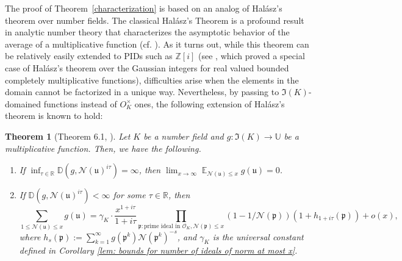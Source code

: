 \documentclass[11pt]{amsart}
\newtheorem{theorem}[lemma]{Theorem}
\theoremstyle{definition}
\DeclareMathOperator*{\E}{\mathbb{E}}
\newcommand{\D}{{\mathbb D}}
\newcommand{\NN}{{\mathcal N}}
\newcommand{\R}{{\mathbb R}}
\newcommand{\Z}{{\mathbb Z}}
\newcommand{\U}{{\mathbb U}}
\newcommand{\mf}{\mathfrak}
\begin{document}
The proof of Theorem~\ref{characterization} is based on an analog of Hal\'asz's theorem over number fields. The classical Hal\'asz's Theorem is a profound result in analytic number theory that characterizes the asymptotic behavior of the average of a multiplicative function (cf. \cite[Satz~1 and Satz~1$'$]{halasz68}). As it turns out, while this theorem can be relatively easily extended to PIDs such as $\Z[i]$ (see \cite[Thoerems A and 1.2]{dlms24}, which proved a special case of Hal\'asz's theorem over the Gaussian integers for real valued bounded completely multiplicative functions), difficulties arise when the elements in the domain cannot be factorized in a unique way. 
 Nevertheless, by passing to $\mf I(K)$-domained functions instead of $O_K^{\times}$ ones, the following extension of Hal\'asz's theorem is known to hold:


\begin{theorem}[Theorem 6.1, \cite{lucht2001}]\label{C22intro}
     Let $K$ be a number field and $g\colon\mf{I}(K)\to\U$ be a multiplicative function. Then, we have the following.
     \begin{enumerate}
         \item If $\inf_{\tau\in\R}\D(g,\NN(\mf u)^{i\tau})=\infty$, then $\lim_{x \to \infty} \E_{\NN(\mf u)\leq x}g(\mf u)=0$.
         \item If $\D(g,\NN(\mf u)^{i\tau})<\infty$ for some $\tau\in\R$, then
         $$\sum_{1 \leq \NN(\mf u)\leq x}g(\mf u) = \gamma_{K}\cdot\frac{x^{1+i\tau}}{1+i\tau}\prod_{\mf p\colon \text{prime ideal in } \mathcal{O}_K,\NN(\mf p)\leq x}(1-1/\NN(\mf p))(1+h_{1+i\tau}(\mf p))+o(x),$$
         where $h_{s}(\mf p):=\sum_{k=1}^{\infty}g(\mf p^{k})\NN(\mf p^{k})^{-s}$, and $\gamma_{K}$ %
         is the universal constant defined in Corollary \ref{lem: bounds for number of ideals of norm at most x}. 
     \end{enumerate}
\end{theorem}
\end{document}
